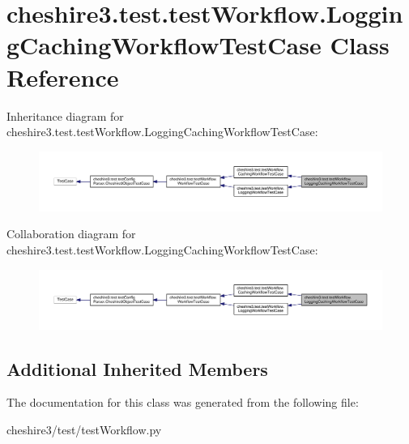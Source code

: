 \hypertarget{classcheshire3_1_1test_1_1test_workflow_1_1_logging_caching_workflow_test_case}{\section{cheshire3.\-test.\-test\-Workflow.\-Logging\-Caching\-Workflow\-Test\-Case Class Reference}
\label{classcheshire3_1_1test_1_1test_workflow_1_1_logging_caching_workflow_test_case}
}


Inheritance diagram for cheshire3.\-test.\-test\-Workflow.\-Logging\-Caching\-Workflow\-Test\-Case\-:
\nopagebreak
\begin{figure}[H]
\begin{center}
\leavevmode
\includegraphics[width=350pt]{classcheshire3_1_1test_1_1test_workflow_1_1_logging_caching_workflow_test_case__inherit__graph}
\end{center}
\end{figure}


Collaboration diagram for cheshire3.\-test.\-test\-Workflow.\-Logging\-Caching\-Workflow\-Test\-Case\-:
\nopagebreak
\begin{figure}[H]
\begin{center}
\leavevmode
\includegraphics[width=350pt]{classcheshire3_1_1test_1_1test_workflow_1_1_logging_caching_workflow_test_case__coll__graph}
\end{center}
\end{figure}
\subsection*{Additional Inherited Members}


The documentation for this class was generated from the following file\-:\begin{DoxyCompactItemize}
\item 
cheshire3/test/test\-Workflow.\-py\end{DoxyCompactItemize}
